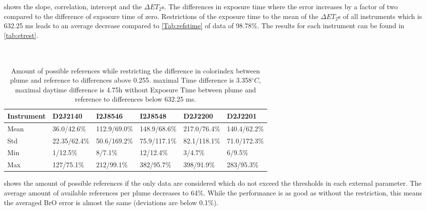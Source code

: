  shows the slope, correlation, intercept and the $\Delta ET_{2}$s. The differences in exposure time where the  error increases by a factor of two compared to the difference of exposure time of zero.
Restrictions of the exposure time to the mean of the $\Delta ET_{2}$s of all instruments which is 632.25 ms leads to an average decrease compared to \cref{Tab:refstime} of data of 98.78\%. The results for each instrument can be found in \cref{tab:etrest}.\\
\\
\\
\begin{table}
	\centering
	\begin{tabular}{|p{1.8cm}|p{2.15cm}|p{2.15cm}|p{2.15cm}|p{2.15cm}|p{2.15cm}|}
		Instrument	&D2J2140&I2J8546& I2J8548&D2J2200&D2J2201\\
		\toprule
		Mean&
		36.0/42.6\%&	112.9/69.0\%&
		148.9/68.6\%&	217.0/76.4\%&	140.4/62.2\%\\
		\midrule
		Std&
		22.35/62.4\%&
		50.6/169.2\% &
		75.9/117.1\%&
		82.1/118.1\% &
		71.0/172.3\% \\
		\midrule
		Min&
		1/12.5\%  &
		8/7.1\%  &
		12/12.4\%  &
		3/4.7\%   &
		6/9.5\%  \\
		\midrule
		Max
		&127/75.1\%
		&212/99.1\%
		&382/95.7\%
		&398/91.9\%
		&283/95.3\%\\
		\bottomrule
	\end{tabular}
	\label{tab:restrictall}
	\caption{Amount of possible references while restricting the difference in colorindex  between plume and reference to differences above 0.255. maximal Time difference is 3.358$^{\circ}C$, maximal daytime difference is 4.75h without Exposure Time  between plume and reference to differences below 632.25 ms.}
\end{table}	
 shows the amount of possible references if the only data are considered which do not exceed the thresholds in each external parameter.  The average amount of available references per plume decreases to 64\%. While the performance is as good as without the restriction, this means the averaged BrO error is almost the same (deviations are below 0.1\%).


